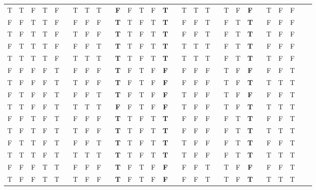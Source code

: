 \documentclass[a4paper,12pt]{article}
\begin{document}
\begin{enumerate}[label=\arabic*,leftmargin=*]
\begin{enumerate}[label=(\roman*)]
\begin{minipage}{\textwidth}
\begin{tabular}{c c c c c | c c c c c c c | c c c c c c c c | c c c c c c c c c}
T & T & F & T & F &   & T & T  & T &   & \textbf{F} & F & T  & F & \textbf{T} &   & T & T  & T &   & T  & F & \textbf{F} &   & T & F  & F &  \\
F & F & T & T & F &   & F & F  & F &   & \textbf{T} & T & F  & T & \textbf{T} &   & F & F  & T &   & F  & T & \textbf{T} &   & F & F  & F &  \\
T & F & T & T & F &   & T & F  & F &   & \textbf{T} & T & F  & T & \textbf{T} &   & F & F  & T &   & F  & T & \textbf{T} &   & T & F  & F &  \\
F & T & T & T & F &   & F & F  & T &   & \textbf{T} & T & F  & T & \textbf{T} &   & T & T  & T &   & F  & T & \textbf{T} &   & F & F  & F &  \\
T & T & T & T & F &   & T & T  & T &   & \textbf{T} & T & F  & T & \textbf{T} &   & T & T  & T &   & F  & T & \textbf{T} &   & T & F  & F &  \\
F & F & F & F & T &   & F & F  & F &   & \textbf{T} & F & T  & F & \textbf{F} &   & F & F  & F &   & T  & F & \textbf{F} &   & F & F  & T &  \\
T & F & F & F & T &   & T & F  & F &   & \textbf{T} & F & T  & F & \textbf{F} &   & F & F  & F &   & T  & F & \textbf{T} &   & T & T  & T &  \\
F & T & F & F & T &   & F & F  & T &   & \textbf{T} & F & T  & F & \textbf{F} &   & T & F  & F &   & T  & F & \textbf{F} &   & F & F  & T &  \\
T & T & F & F & T &   & T & T  & T &   & \textbf{F} & F & T  & F & \textbf{F} &   & T & F  & F &   & T  & F & \textbf{T} &   & T & T  & T &  \\
F & F & T & F & T &   & F & F  & F &   & \textbf{T} & T & F  & T & \textbf{T} &   & F & F  & F &   & F  & T & \textbf{T} &   & F & F  & T &  \\
T & F & T & F & T &   & T & F  & F &   & \textbf{T} & T & F  & T & \textbf{T} &   & F & F  & F &   & F  & T & \textbf{T} &   & T & T  & T &  \\
F & T & T & F & T &   & F & F  & T &   & \textbf{T} & T & F  & T & \textbf{T} &   & T & F  & F &   & F  & T & \textbf{T} &   & F & F  & T &  \\
T & T & T & F & T &   & T & T  & T &   & \textbf{T} & T & F  & T & \textbf{T} &   & T & F  & F &   & F  & T & \textbf{T} &   & T & T  & T &  \\
F & F & F & T & T &   & F & F  & F &   & \textbf{T} & F & T  & F & \textbf{F} &   & F & F  & T &   & T  & F & \textbf{F} &   & F & F  & T &  \\
T & F & F & T & T &   & T & F  & F &   & \textbf{T} & F & T  & F & \textbf{F} &   & F & F  & T &   & T  & F & \textbf{T} &   & T & T  & T &  \\

\end{tabular}
\end{minipage}
\end{enumerate}
\end{enumerate}
\end{document}
